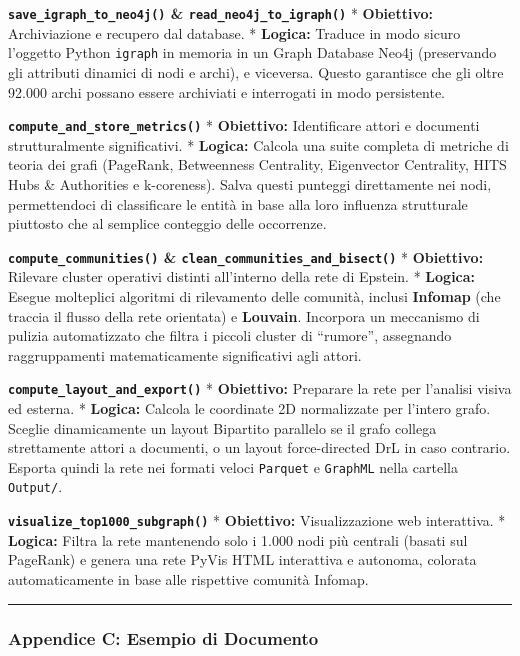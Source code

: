 \documentclass[
  italian,
  a4paper,
]{article}
\begin{document}
\textbf{\texttt{save\_igraph\_to\_neo4j()} \&
\texttt{read\_neo4j\_to\_igraph()}} * \textbf{Obiettivo:} Archiviazione
e recupero dal database. * \textbf{Logica:} Traduce in modo sicuro
l'oggetto Python \texttt{igraph} in memoria in un Graph Database Neo4j
(preservando gli attributi dinamici di nodi e archi), e viceversa.
Questo garantisce che gli oltre 92.000 archi possano essere archiviati e
interrogati in modo persistente.

\textbf{\texttt{compute\_and\_store\_metrics()}} * \textbf{Obiettivo:}
Identificare attori e documenti strutturalmente significativi. *
\textbf{Logica:} Calcola una suite completa di metriche di teoria dei
grafi (PageRank, Betweenness Centrality, Eigenvector Centrality, HITS
Hubs \& Authorities e k-coreness). Salva questi punteggi direttamente
nei nodi, permettendoci di classificare le entità in base alla loro
influenza strutturale piuttosto che al semplice conteggio delle
occorrenze.

\textbf{\texttt{compute\_communities()} \&
\texttt{clean\_communities\_and\_bisect()}} * \textbf{Obiettivo:}
Rilevare cluster operativi distinti all'interno della rete di Epstein. *
\textbf{Logica:} Esegue molteplici algoritmi di rilevamento delle
comunità, inclusi \textbf{Infomap} (che traccia il flusso della rete
orientata) e \textbf{Louvain}. Incorpora un meccanismo di pulizia
automatizzato che filtra i piccoli cluster di ``rumore'', assegnando
raggruppamenti matematicamente significativi agli attori.

\textbf{\texttt{compute\_layout\_and\_export()}} * \textbf{Obiettivo:}
Preparare la rete per l'analisi visiva ed esterna. * \textbf{Logica:}
Calcola le coordinate 2D normalizzate per l'intero grafo. Sceglie
dinamicamente un layout Bipartito parallelo se il grafo collega
strettamente attori a documenti, o un layout force-directed DrL in caso
contrario. Esporta quindi la rete nei formati veloci \texttt{Parquet} e
\texttt{GraphML} nella cartella \texttt{Output/}.

\textbf{\texttt{visualize\_top1000\_subgraph()}} * \textbf{Obiettivo:}
Visualizzazione web interattiva. * \textbf{Logica:} Filtra la rete
mantenendo solo i 1.000 nodi più centrali (basati sul PageRank) e genera
una rete PyVis HTML interattiva e autonoma, colorata automaticamente in
base alle rispettive comunità Infomap.

\begin{center}\rule{0.5\linewidth}{0.5pt}\end{center}

\subsubsection{Appendice C: Esempio di
Documento}\label{appendice-c-esempio-di-documento}
\end{document}

